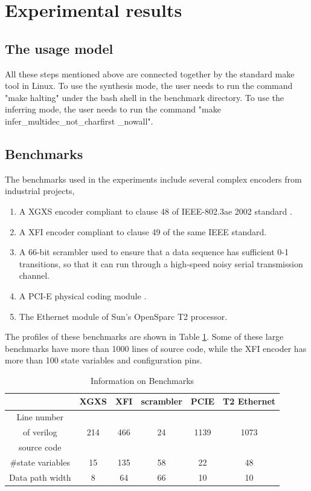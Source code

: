 \documentclass[runningheads,a4paper]{llncs}
\begin{document}
\section{Experimental results}\label{sec_exp}
\subsection{The usage model}
All these steps mentioned above are connected together by the standard make tool in Linux.
To use the synthesis mode,
the user needs to run the command "make halting" under the bash shell in the benchmark directory.
To use the inferring mode,
the user needs to run the command "make infer\_multidec\_not\_charfirst \_nowall".

\subsection{Benchmarks}
The benchmarks used in the experiments include several complex encoders from industrial projects,
\begin{enumerate}
\item A XGXS encoder compliant to clause 48 of IEEE-802.3ae 2002 standard \cite{IEEE80232002}.
\item A XFI encoder compliant to clause 49 of the same IEEE standard.
\item A 66-bit scrambler used to ensure
that a data sequence has sufficient 0-1 transitions,
so that it can run through a high-speed
noisy serial transmission channel.
\item A PCI-E physical coding module \cite{PCIESPEC}.
\item The Ethernet module of Sun's OpenSparc T2 processor.
\end{enumerate}

The profiles of these benchmarks are shown in Table \ref{tab_benchmark}.
Some of these large benchmarks have more than 1000 lines of source code,
while the XFI encoder has more than 100 state variables and configuration pins.


\begin{table}[t]
\centering
\caption{Information on Benchmarks}
\begin{tabular}{|c|c|c|c|c|c|}
\hline
&XGXS&XFI&scrambler&PCIE&T2 Ethernet\\\hline\hline
Line number&&&&&\\
of verilog&214&466&24&1139&1073\\
source code&&&&&\\\hline
\#state variables&15&135&58&22&48\\\hline
Data path width&8&64&66&10&10\\\hline
\end{tabular}\label{tab_benchmark}
\end{table}
\end{document}

